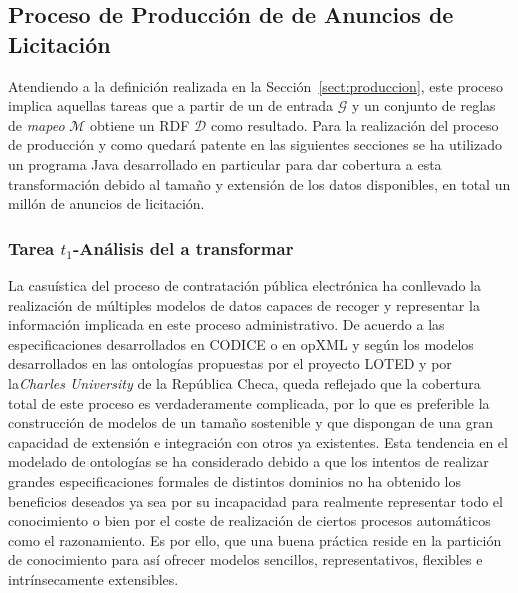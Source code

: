 \subsection{Proceso de Producción de \linkeddata de Anuncios de Licitación}
Atendiendo a la definición realizada en la Sección~\ref{sect:produccion}, este proceso 
implica aquellas tareas que a partir de un \dataset de entrada $\mathcal{G}$ y un conjunto 
de reglas de \textit{mapeo} $\mathcal{M}$ obtiene un \dataset \gls{RDF} $\mathcal{D}$ como resultado. Para la realización 
del proceso de producción y como quedará patente en las siguientes secciones se ha utilizado un programa 
Java desarrollado en particular para dar cobertura a esta transformación debido al tamaño y extensión 
de los datos disponibles, en total un millón de anuncios de licitación.

\subsubsection{Tarea $t_1$-Análisis del \dataset a transformar}\label{t1-ppn}
La casuística del proceso de contratación pública electrónica ha conllevado la realización 
de múltiples modelos de datos capaces de recoger y representar la información implicada 
en este proceso administrativo. De acuerdo a las especificaciones desarrollados en CODICE o en 
\gls{opXML} y según los modelos desarrollados en las ontologías propuestas por el proyecto LOTED 
y por la\textit{Charles University} de la República Checa, queda reflejado que la cobertura total 
de este proceso es verdaderamente complicada, por lo que es preferible la construcción 
de modelos de un tamaño sostenible y que dispongan de una gran capacidad de extensión 
e integración con otros ya existentes. Esta tendencia en el modelado de ontologías 
se ha considerado debido a que los intentos de realizar grandes especificaciones formales 
de distintos dominios no ha obtenido los beneficios deseados ya sea por su incapacidad para 
realmente representar todo el conocimiento o bien por el coste de realización de ciertos 
procesos automáticos como el razonamiento. Es por ello, que una buena práctica reside 
en la partición de conocimiento para así ofrecer modelos sencillos, representativos, flexibles 
e intrínsecamente extensibles.

